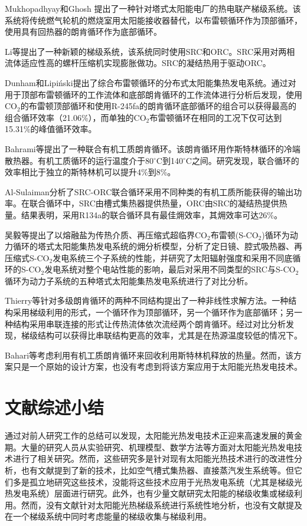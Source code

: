 Mukhopadhyay和Ghosh\cite{Mukhopadhyay2016}
提出了一种针对塔式太阳能电厂的热电联产梯级系统。该系统将传统燃气轮机的燃烧室用太阳能接收器替代，以布雷顿循环作为顶部循环，使用具有回热器的朗肯循环作为底部循环。

Li等\cite{Li2016a}提出了一种新颖的梯级系统，该系统同时使用SRC和ORC。SRC采用对两相流体适应性高的螺杆压缩机实现膨胀做功。SRC的凝结热用于驱动ORC。

Dunham和Lipi\'{n}ski\cite{Dunham2013}提出了综合布雷顿循环的分布式太阳能集热发电系统。通过对用于顶部布雷顿循环的工作流体和底部朗肯循环的工作流体进行分析后发现，使用CO$_2$的布雷顿顶部循环和使用R-245fa的朗肯循环底部循环的组合可以获得最高的组合循环效率（21.06\%），而单独的CO$_2$布雷顿循环在相同的工况下仅可达到15.31\%的峰值循环效率。

Bahrami等\cite{Bahrami2013}提出了一种联合有机工质朗肯循环。该朗肯循环用作斯特林循环的冷端散热器。有机工质循环的运行温度介于80$\mathrm{^\circ C}$到140$\mathrm{^\circ C}$之间。研究发现，联合循环的效率相比于独立的斯特林机可以提升4\%到8\%。

Al-Sulaiman\cite{AlSulaiman2014}分析了SRC-ORC联合循环采用不同种类的有机工质所能获得的输出功率。在联合循环中，SRC由槽式集热器提供热量，ORC由SRC的凝结热提供热量。结果表明，采用R134a的联合循环具有最佳㶲效率，其㶲效率可达26\%。

吴毅等\cite{Wu2016}提出了以熔融盐为传热介质、再压缩式超临界CO$_2$布雷顿(S-CO$_2$)循环为动力循环的塔式太阳能集热发电系统的㶲分析模型，分析了定日镜、腔式吸热器、再压缩式S-CO$_2$发电系统三个子系统的性能，并研究了太阳辐射强度和采用不同底循环的S-CO$_2$发电系统对整个电站性能的影响，最后对采用不同类型的SRC与S-CO$_2$循环为动力子系统的五种塔式太阳能集热发电系统进行了对比分析。

Thierry等\cite{Thierry2016}针对多级朗肯循环的两种不同结构提出了一种非线性求解方法。一种结构采用梯级利用的形式，一个循环作为顶部循环，另一个循环作为底部循环；另一种结构采用串联连接的形式让传热流体依次流经两个朗肯循环。经过对比分析发现，梯级结构可以获得比串联结构更高的效率，尤其是在热源温度较低的情况下。

Bahari等\cite{Bahari2016}考虑利用有机工质朗肯循环来回收利用斯特林机释放的热量。然而，该方案只是一个原始的设计方案，也没有考虑到将该方案应用于太阳能光热发电技术。

\section{文献综述小结}
通过对前人研究工作的总结可以发现，太阳能光热发电技术正迎来高速发展的黄金期。大量的研究人员从实验研究、机理模型、数学方法等方面对太阳能光热发电技术进行了相关研究。然而，这些研究多是针对现有太阳能光热技术进行的改进性分析，也有文献提到了新的技术，比如空气槽式集热器、直接蒸汽发生系统等。但它们多是孤立地研究这些技术，没能将这些技术应用于光热发电系统（尤其是梯级光热发电系统）层面进行研究。此外，也有少量文献研究太阳能的梯级收集或梯级利用。然而，没有文献针对太阳能光热梯级系统进行系统性地分析，也没有文献提及在一个梯级系统中同时考虑能量的梯级收集与梯级利用。

